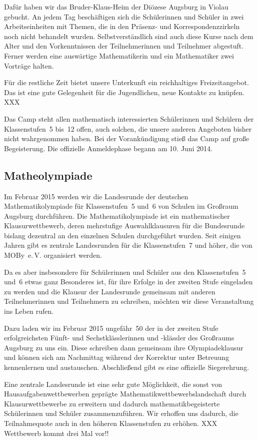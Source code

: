 \documentclass[12pt]{zettel}
\begin{document}
Dafür haben wir das Bruder-Klaus-Heim der Diözese Augsburg in Violau
gebucht. An jedem Tag beschäftigen sich die Schülerinnen und Schüler in zwei
Arbeitseinheiten mit Themen, die in den Präsenz- und Korrespondenzzirkeln noch
nicht behandelt wurden. Selbstverständlich sind auch diese Kurse nach dem Alter
und den Vorkenntnissen der Teilnehmerinnen und Teilnehmer abgestuft. Ferner
werden eine auswärtige Mathematikerin und ein Mathematiker zwei Vorträge halten.

Für die restliche Zeit bietet unsere Unterkunft ein reichhaltiges
Freizeitangebot. Das ist eine gute Gelegenheit für die Jugendlichen, neue
Kontakte zu knüpfen. XXX

Das Camp steht allen mathematisch interessierten Schülerinnen und Schülern der
Klassenstufen~5 bis~12 offen, auch solchen, die unsere anderen Angeboten bisher
nicht wahrgenommen haben. Bei der Vorankündigung stieß das Camp auf große
Begeisterung. Die offizielle Anmeldephase begann am 10. Juni 2014.


\subsection{Matheolympiade}

Im Februar 2015 werden wir die Landesrunde der deutschen
Mathematikolympiade für Klassenstufen~5 und~6 von Schulen im Großraum
Augsburg durchführen. Die Mathematikolympiade ist ein mathematischer
Klausurwettbewerb, deren mehrstufige Auswahlklausuren für die Bundesrunde
bislang dezentral an den einzelnen Schulen durchgeführt wurden. Seit einigen
Jahren gibt es zentrale Landesrunden für die Klassenstufen~7 und höher, die von
MOBy~e.\,V. organisiert werden.

Da es aber insbesondere für Schülerinnen und Schüler aus den Klassenstufen~5
und~6 etwas ganz Besonderes ist, für ihre Erfolge in der zweiten Stufe
eingeladen zu werden und die Klausur der Landesrunde gemeinsam mit anderen
Teilnehmerinnen und Teilnehmern zu schreiben, möchten wir diese Veranstaltung
ins Leben rufen.

Dazu laden wir im Februar 2015 ungefähr~50 der in der zweiten Stufe
erfolgreichsten Fünft- und Sechstklässlerinnen und -klässler des Großraums
Augsburg zu uns ein. Diese schreiben dann gemeinsam ihre Olympiadeklausur und
können sich am Nachmittag während der Korrektur unter Betreuung kennenlernen
und austauschen. Abschließend gibt es eine offizielle Siegerehrung.

Eine zentrale Landesrunde ist eine sehr gute Möglichkeit, die sonst von
Hausaufgabenwettbewerben geprägte Mathematikwettbewerbslandschaft durch
Klausurwettbewerbe zu erweitern und dadurch mathematikbegeisterte Schülerinnen
und Schüler zusammenzuführen. Wir erhoffen uns dadurch, die Teilnahmequote auch
in den höheren Klassenstufen zu erhöhen. XXX Wettbewerb kommt drei Mal vor!!
\end{document}
